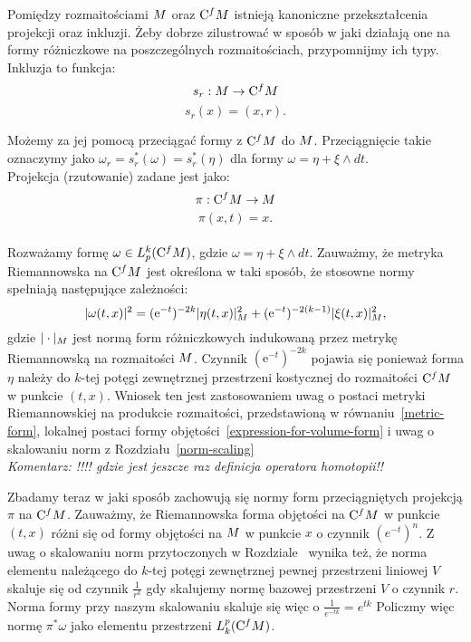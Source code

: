 \documentclass[licencjacka]{pracamgr}
\theoremstyle{definition}
\theoremstyle{definition}
\theoremstyle{plain}
\theoremstyle{plain}
\theoremstyle{plain}
\theoremstyle{plain}
\def\cfm{\ensuremath\mathrm{C}^fM}
\def\M{\ensuremath M}
\begin{document}
Pomiędzy rozmaitościami $\M$ oraz $\cfm$ istnieją kanoniczne przekształcenia
projekcji oraz inkluzji. Żeby dobrze zilustrować w sposób w jaki działają one
na formy różniczkowe na poszczególnych rozmaitościach, przypomnijmy ich typy.
Inkluzja to funkcja:
\[
    s_r: \M \rightarrow \cfm \\
\]
\[
    s_r(x) = (x, r).
\]

Możemy za jej pomocą przeciągać formy z $\cfm$ do $\M$. Przeciągnięcie takie
oznaczymy jako $\omega_r = s_r^\ast(\omega) = s_r^\ast (\eta) $ dla formy $\omega
= \eta + \xi \wedge dt$. \\
Projekcja (rzutowanie) zadane jest jako:
\[
    \pi: \cfm \rightarrow \M
\]
\[
    \pi (x, t) = x.
\] \\


Rozważamy formę $\omega \in L^k_p (\cfm)$, gdzie
$\omega = \eta + \xi \wedge dt$.
Zauważmy, że metryka Riemannowska na $\cfm$ jest określona w taki sposób, że
stosowne normy spełniają następujące zależności:
\begin{equation}\label{cfm-norms-scaling}
| \omega(t,x) |^2 = (\mathrm{e}^{-t})^{-2k} | \eta(t,x) |^2_{\M} +
(\mathrm{e}^{-t})^{-2(k-1)} | \xi(t,x) |^2_{\M},
\end{equation}
gdzie $|\cdot |_{\M} $ jest normą form różniczkowych indukowaną przez
metrykę Riemannowską na rozmaitości $\M$.  Czynnik $(\mathrm{e}^{-t})^{-2k}$
pojawia się ponieważ forma $\eta$ należy do $k$-tej potęgi zewnętrznej
przestrzeni kostycznej do rozmaitości $\cfm$ w punkcie $(t,x)$. 
Wniosek ten jest zastosowaniem uwag
o postaci metryki Riemannowskiej na produkcie
rozmaitości, przedstawioną w równaniu~\ref{metric-form}, lokalnej
postaci formy objętości~\ref{expression-for-volume-form} i uwag
o skalowaniu norm z Rozdziału~\ref{norm-scaling} \\

\emph{Komentarz: !!!! gdzie jest jeszcze raz definicja operatora homotopii!!}


Zbadamy teraz w jaki sposób zachowują się normy form przeciągniętych projekcją
$\pi$ na $\cfm$.  Zauważmy, że Riemannowska forma objętości na $\cfm$ w punkcie
$(t,x)$ różni się od formy objętości na $\M$ w punkcie $x$ o czynnik
$(e^{-t})^n$.  Z uwag o skalowaniu norm przytoczonych w
Rozdziale~\label{norm-scaling} wynika też, że norma elementu należącego do
$k$-tej potęgi zewnętrznej pewnej przestrzeni liniowej $V$ skaluje się od
czynnik $\frac{1}{r^k}$ gdy skalujemy normę bazowej przestrzeni $V$ o czynnik
$r$.  Norma formy przy naszym skalowaniu skaluje się więc o $\frac{1}{e^{-tk}}
= e^{tk}$ Policzmy więc normę $\pi^\ast \omega$ jako elementu przestrzeni
$L_k^p (\cfm)$.
\end{document}
